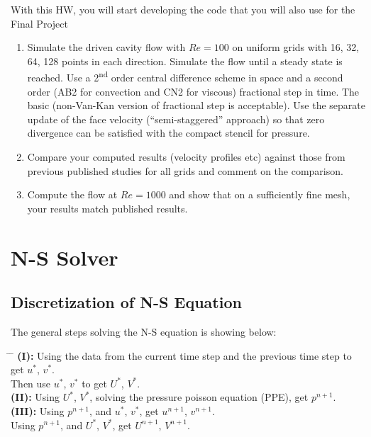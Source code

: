 \documentclass[12pt]{article}
\begin{document}
With this HW, you will start developing the code that you will also use for the Final Project

\begin{enumerate}
    \item Simulate the driven cavity flow with \( Re=100 \) on uniform grids with 16, 32, 64, 128 points in each direction. Simulate the flow until a steady state is reached. Use a 2\textsuperscript{nd} order central difference scheme in space and a second order (AB2 for convection and CN2 for viscous) fractional step in time. The basic (non-Van-Kan version of fractional step is acceptable). Use the separate update of the face velocity (``semi-staggered'' approach) so that zero divergence can be satisfied with the compact stencil for pressure.

    \item Compare your computed results (velocity profiles etc) against those from previous published studies for all grids and comment on the comparison.

    \item Compute the flow at \( Re=1000 \) and show that on a sufficiently fine mesh, your results match published results.
\end{enumerate}






\newpage
\section{N-S Solver}
\subsection{Discretization of N-S Equation}
The general steps solving the N-S equation is showing below:\\



\begin{tabbing}
\hspace*{2cm} \= \hspace*{2.5cm} \= \kill
\textbf{(I):} \> Using the data from the current time step and the previous time step to get $u^{*}$, $v^{*}$. \\
\> Then use $u^{*}$, $v^{*}$ to get $U^{*}$, $V^{*}$.\\


\textbf{(II):} \> Using $U^{*}$, $V^{*}$, solving the pressure poisson equation (PPE),  get $p^{n+1}$.\\


\textbf{(III):} \> Using $p^{n+1}$, and $u^{*}$, $v^{*}$, get $u^{n+1}$, $v^{n+1}$. \\
\> Using $p^{n+1}$, and $U^{*}$, $V^{*}$, get $U^{n+1}$, $V^{n+1}$.
\end{tabbing}
\end{document}
